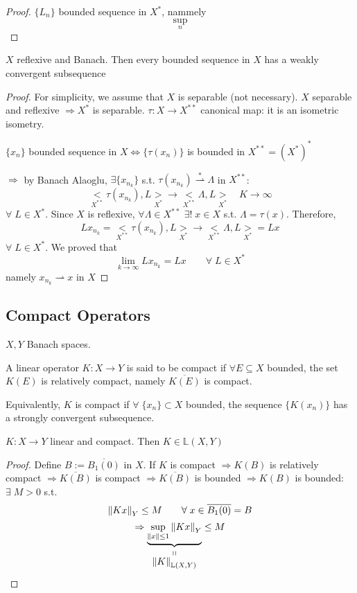 \begin{proof}
    \(\{L_n\}\) bounded sequence in \(X^*\), nammely
    \[
        \sup_{n} 
    \]
\end{proof}

\begin{theorem}
    \(X\) reflexive and Banach. Then every bounded sequence in \(X\) has a weakly convergent subsequence
\end{theorem}

\begin{proof}
    For simplicity, we assume that \(X\) is separable (not necessary). \(X \) separable and reflexive \(\Rightarrow X^*\) is separable. \(\tau:X \to X^{**}\) canonical map: it is an isometric isometry.

    \(\{x_n\}\) bounded sequence in \(X \iff \{ \tau(x_n) \}\) is bounded in \(X^{**} = (X^*)^*\)
        
    \(\Rightarrow \) by Banach Alaoglu, \(\exists \{x_{n_k}\}\) s.t. \(\tau(x_{n_k}) \overset{*}{\rightharpoonup} \Lambda \) in \(X^{**}\):
    \[
        \underset{X^{**}}{<}\tau(x_{n_k}), L \underset{X^*}{>} \to \underset{X^{**}}{<}\Lambda, L \underset{X^*}{>} \quad K \to \infty
    \]
    \(\forall\; L \in X^*.\) Since \(X\) is reflexive, \(\forall \Lambda \in X^{**} \) \(\exists ! \; x \in X\) s.t. \(\Lambda = \tau (x)\). Therefore, 
    \[
        L x_{n_k} = \underset{X^{**}}{<}\tau(x_{n_k}), L \underset{X^*}{>} \to \underset{X^{**}}{<}\Lambda, L \underset{X^*}{>} = Lx
    \]
    \(\forall\; L \in X^*\). We proved that 
    \[
        \lim_{k \to \infty} L x_{n_k} = Lx \qquad \forall\; L \in X^*
    \]
    namely \(x_{n_k} \rightharpoonup x\) in \(X\)
\end{proof}

\subsection*{Compact Operators}
\(X, Y\) Banach spaces. 
\begin{definition}
    A linear operator \(K:X \to Y\) is said to be compact if \(\forall E \subseteq X\) bounded, the set \(K(E)\) is relatively compact, namely \(\overline{K(E)}\) is compact. 

    Equivalently, \(K\) is compact if \(\forall \; \{x_n\} \subset X \) bounded, the sequence \(\{K(x_n)\}\) has a strongly convergent subsequence. 
\end{definition}
\begin{proposition}
    \(K:X \to Y\) linear and compact. Then \(K \in \mathbb{L}(X, Y)\)
\end{proposition}
\begin{proof}
    Define \(B:=\overline{B_1(0)}\) in \(X\). If \(K\) is compact 
    \(\Rightarrow K(B) \) is relatively compact 
    \(\Rightarrow \overline{K(B)}\) is compact 
    \(\Rightarrow \overline{K(B)}\) is bounded
    \(\Rightarrow K(B)\) is bounded: \(\exists \; M>0 \) s.t. 
    \[
        \norm{Kx}_Y \leq M \qquad \forall \; x \in \overline{B_1(0)} = B
    \]
    \[
        \Rightarrow \stackbelow{\underbrace{\sup_{\norm{x} \leq 1} \norm{Kx}_Y}}{\norm{K}_{\mathbb{L}(X, Y)}} \leq M
    \]
\end{proof}

